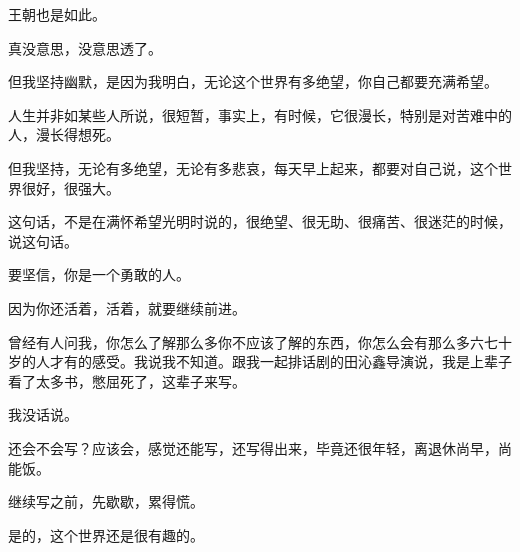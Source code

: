 \begin{multicols}{\theparacolNo}
		王朝也是如此。

		真没意思，没意思透了。

		但我坚持幽默，是因为我明白，无论这个世界有多绝望，你自己都要充满希望。

		人生并非如某些人所说，很短暂，事实上，有时候，它很漫长，特别是对苦难中的人，漫长得想死。

		但我坚持，无论有多绝望，无论有多悲哀，每天早上起来，都要对自己说，这个世界很好，很强大。

		这句话，不是在满怀希望光明时说的，很绝望、很无助、很痛苦、很迷茫的时候，说这句话。

		要坚信，你是一个勇敢的人。

		因为你还活着，活着，就要继续前进。

		曾经有人问我，你怎么了解那么多你不应该了解的东西，你怎么会有那么多六七十岁的人才有的感受。我说我不知道。跟我一起排话剧的田沁鑫导演说，我是上辈子看了太多书，憋屈死了，这辈子来写。

		我没话说。

		还会不会写？应该会，感觉还能写，还写得出来，毕竟还很年轻，离退休尚早，尚能饭。

		继续写之前，先歇歇，累得慌。

		是的，这个世界还是很有趣的。


\end{multicols}

